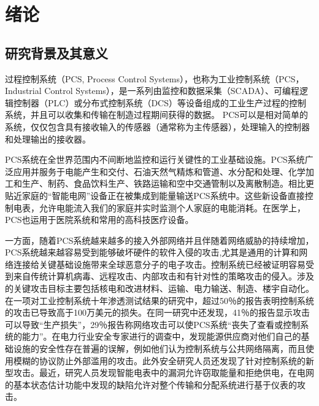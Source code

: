 

\chapter{绪论}
\label{chap:intro}



\section{研究背景及其意义}

过程控制系统（PCS, Process Control Systems），也称为工业控制系统（PCS，Industrial Control Systems），是一系列由监控和数据采集（SCADA）、可编程逻辑控制器（PLC）或分布式控制系统（DCS）等设备组成的工业生产过程的控制系统，并且可以收集和传输在制造过程期间获得的数据。 PCS可以是相对简单的系统，仅仅包含具有接收输入的传感器（通常称为主传感器），处理输入的控制器和处理输出的接收器。

PCS系统在全世界范围内不间断地监控和运行关键性的工业基础设施。PCS系统广泛应用并服务于电能产生和交付、石油天然气精炼和管道、水分配和处理、化学加工和生产、制药、食品饮料生产、铁路运输和空中交通管制以及离散制造\parencite{Stouffer11,Weiss10,Hentea08}。相比更贴近家庭的“智能电网”设备正在被集成到能量输送PCS系统中。这些新设备直接控制电表，允许电能流入我们的家庭并实时监测个人家庭的电能消耗。在医学上，PCS也运用于医院系统和常用的高科技医疗设备。

一方面，随着PCS系统越来越多的接入外部网络并且伴随着网络威胁的持续增加，PCS系统越来越容易受到能够破坏硬件的软件入侵的攻击,尤其是通用的计算和网络连接给关键基础设施带来全球恶意分子的电子攻击。控制系统已经被证明容易受到来自传统计算机病毒\parencite{Roberts08,Krebs08}、远程攻击\parencite{Grad10}、内部攻击\parencite{Leall09}和有针对性的策略攻击\parencite{Zetter10}的侵入。涉及的关键攻击目标主要包括核电和改进材料\parencite{Krebs08,Leyden08}、运输\parencite{Grad10}、电力输送\parencite{Meserve07}、制造\parencite{Roberts08}、楼宇自动化\parencite{Leall09}。
在一项对工业控制系统十年渗透测试结果的研究中，超过50％的报告表明控制系统的攻击已导致高于100万美元的损失\parencite{Byres03}。在同一研究中还发现，41％的报告显示攻击可以导致“生产损失”，29％报告称网络攻击可以使PCS系统“丧失了查看或控制系统的能力”。在电力行业安全专家进行的调查中，发现能源供应商对他们自己的基础设施的安全性存在普遍的误解，例如他们认为控制系统与公共网络隔离，而且使用模糊的协议防止外部滥用的攻击\parencite{1Pietre11}。此外安全研究人员还发现了针对控制系统的新型攻击。最近，研究人员发现智能电表中的漏洞允许窃取能量和拒绝供电\parencite{1McLaughlin09,1McLaughlin10}，在电网的基本状态估计功能中发现的缺陷允许对整个传输和分配系统进行基于仪表的攻击\parencite{1Liu09}。

